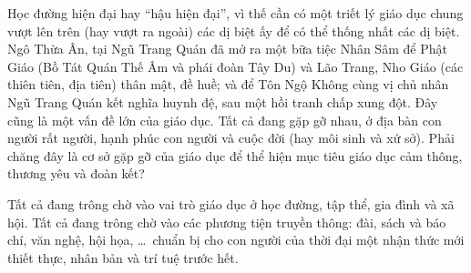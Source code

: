 Học đường hiện đại hay ``hậu hiện đại'', vì thế cần có một triết lý giáo dục chung vượt lên trên (hay vượt ra ngoài) các dị biệt ấy để có thể thống nhất các dị biệt. Ngô Thừa Ân, tại Ngũ Trang Quán đã mở ra một bữa tiệc Nhân Sâm để Phật Giáo (Bồ Tát Quán Thế Âm và phái đoàn Tây Du) và Lão Trang, Nho Giáo (các thiên tiên, địa tiên) thân mật, đề huề; và để Tôn Ngộ Không cùng vị chủ nhân Ngũ Trang Quán kết nghĩa huynh đệ, sau một hồi tranh chấp xung đột. Đây cũng là một vấn đề lớn của giáo dục. Tất cả đang gặp gỡ nhau, ở địa bàn con người rất người, hạnh phúc con người và cuộc đời (hay môi sinh và xứ sở). Phải chăng đây là cơ sở gặp gỡ của giáo dục để thể hiện mục tiêu giáo dục cảm thông, thương yêu và đoàn kết?

Tất cả đang trông chờ vào vai trò giáo dục ở học đường, tập thể, gia đình và xã hội. Tất cả đang trông chờ vào các phương tiện truyền thông: đài, sách và báo chí, văn nghệ, hội họa, \ldots ~chuẩn bị cho con người của thời đại một nhận thức mới thiết thực, nhân bản và trí tuệ trước hết.


